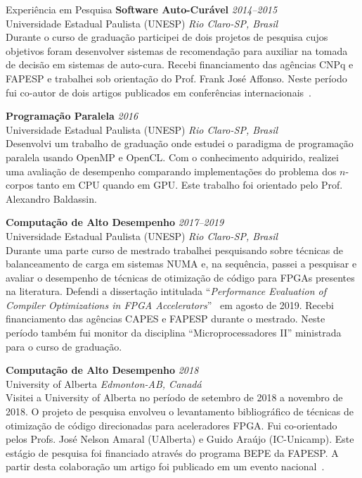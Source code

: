 \documentclass[a4paper]{resume}
\begin{document}
\begin{rSection}{Experiência em Pesquisa}
{\bf Software Auto-Curável} \hfill {\em 2014--2015} \\
{\sc Universidade Estadual Paulista (UNESP)} \hfill {\em Rio Claro-SP, Brasil} \\
Durante o curso de graduação participei de dois projetos de pesquisa cujos
objetivos foram desenvolver sistemas de recomendação para auxiliar na tomada de
decisão em sistemas de auto-cura. Recebi financiamento das agências CNPq e
FAPESP e trabalhei sob orientação do Prof. Frank José Affonso. Neste período fui
co-autor de dois artigos publicados em conferências
internacionais~\cite{SEKE16,SEKE15}.

{\bf Programação Paralela} \hfill {\em 2016} \\
{\sc Universidade Estadual Paulista (UNESP)} \hfill {\em Rio Claro-SP, Brasil} \\
Desenvolvi um trabalho de graduação onde estudei o paradigma de programação
paralela usando OpenMP e OpenCL. Com o conhecimento adquirido, realizei uma
avaliação de desempenho comparando implementações do problema dos $n$-corpos
tanto em CPU quando em GPU. Este trabalho foi orientado pelo Prof. Alexandro
Baldassin.

{\bf Computação de Alto Desempenho} \hfill {\em 2017--2019} \\
{\sc Universidade Estadual Paulista (UNESP)} \hfill {\em Rio Claro-SP, Brasil} \\
Durante uma parte curso de mestrado trabalhei pesquisando sobre técnicas de
balanceamento de carga em sistemas NUMA e, na sequência, passei a pesquisar e
avaliar o desempenho de  técnicas de otimização de código para FPGAs presentes
na literatura. Defendi a dissertação intitulada ``{\it Performance Evaluation of
Compiler Optimizations in FPGA Accelerators}''~\cite{Master19} em agosto de
2019. Recebi financiamento das agências CAPES e FAPESP durante o mestrado. Neste
período também fui monitor da disciplina ``Microprocessadores II'' ministrada
para o curso de graduação.

{\bf Computação de Alto Desempenho} \hfill {\em 2018} \\
{\sc University of Alberta} \hfill {\em Edmonton-AB, Canadá} \\
Visitei a University of Alberta no período de setembro de 2018 a novembro de
2018. O projeto de pesquisa envolveu o levantamento bibliográfico de técnicas de
otimização de código direcionadas para aceleradores FPGA. Fui co-orientado pelos
Profs. José Nelson Amaral (UAlberta) e Guido Araújo (IC-Unicamp). Este estágio
de pesquisa foi financiado através do programa BEPE da FAPESP. A partir desta
colaboração um artigo foi publicado em um evento nacional~\cite{WSCAD19}.
\end{rSection}
\end{document}
